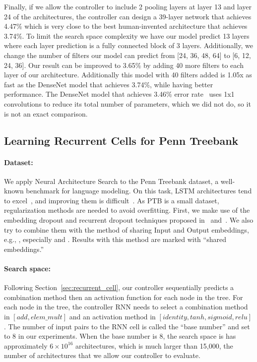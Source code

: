 \documentclass{article} \usepackage{iclr2017_conference,times}
\begin{document}
Finally, if we allow the controller to include 2 pooling layers at layer 13 and layer 24 of the architectures, the controller can design a 39-layer network that achieves 4.47\% which is very close to the best human-invented architecture that achieves 3.74\%. To limit the search space complexity we have our model predict 13 layers where each layer prediction is a fully connected block of 3 layers. Additionally, we change the number of filters our model can predict from [24, 36, 48, 64] to [6, 12, 24, 36]. Our result can be improved to 3.65\% by adding 40 more filters  to each layer of our architecture. Additionally this model with 40 filters added is 1.05x as fast as the DenseNet model that achieves 3.74\%, while having better performance. The DenseNet model that achieves 3.46\% error rate~\citep{Huang2016Densely2} uses 1x1 convolutions to reduce its total number of parameters, which we did not do, so it is not an exact comparison.



\subsection{Learning Recurrent Cells for Penn Treebank}









\paragraph{Dataset:} We apply Neural Architecture Search to the Penn Treebank dataset, a well-known benchmark for language modeling. On this task, LSTM architectures tend to excel~\citep{ZarembaReg, Gal2015}, and improving them is  difficult~\citep{jozefowicz2015empirical}. As PTB is a small dataset, regularization methods are needed to avoid overfitting. First, we make use of the embedding dropout and recurrent dropout techniques proposed in~\cite{ZarembaReg} and~\citep{Gal2015}. We also try to combine them with the method of sharing Input and Output embeddings, e.g., \cite{bengio2003neural,mnih2007three}, especially \cite{SocherEmbedding} and \cite{shareEmbedding}. Results with this method are marked with ``shared embeddings.''



\paragraph{Search space:} Following Section~\ref{sec:recurrent_cell}, our controller sequentially predicts a combination method then an activation function for each node in the tree. 
For each node in the tree, the controller RNN needs to select a combination method in $[add, elem\_mult]$ and an activation method in $[identity, tanh, sigmoid, relu]$. The number of input pairs to the RNN cell is called the ``base number'' and set to 8 in our experiments. When the base number is 8, the search space is has approximately $6 \times 10^{16}$ architectures, which is much larger than 15,000, the number of architectures that we allow our controller to evaluate.
\end{document}
